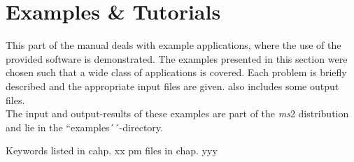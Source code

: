 

\chapter{Examples \& Tutorials}
\label{sec:Examples Tutorials}


This part of the manual deals with example applications, where the use of the provided software is demonstrated. The examples presented in this section were chosen such that a wide class of applications is covered. Each problem is briefly described and the appropriate input files are given. also includes some output files. \\
The input and output-results of these examples are part of the \textit{ms}2 distribution and lie in the ``examples´´-directory.

Keywords listed in cahp. xx
pm files in chap. yyy


